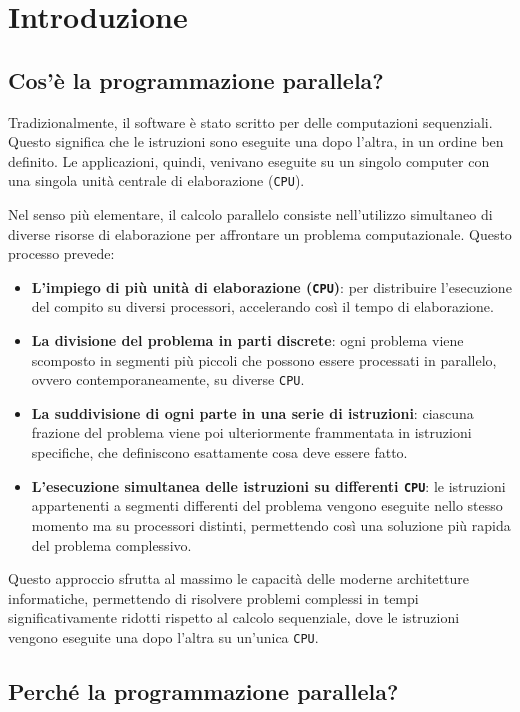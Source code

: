 \chapter{Introduzione}
\section{Cos'è la programmazione parallela?}
Tradizionalmente, il software è stato scritto per delle 
computazioni sequenziali. Questo significa che le istruzioni
sono eseguite una dopo l'altra, in un ordine ben definito.
Le applicazioni, quindi, venivano eseguite su un singolo
computer con una singola unità centrale di elaborazione (\texttt{CPU}).

Nel senso più elementare, il calcolo parallelo consiste nell'utilizzo
simultaneo di diverse risorse di elaborazione
per affrontare un problema computazionale. Questo processo prevede:
\begin{itemize}
    \item \textbf{L'impiego di più unità di elaborazione (\texttt{CPU})}: per distribuire
    l'esecuzione del compito
    su diversi processori, accelerando così il tempo di elaborazione.
    \item \textbf{La divisione del problema in parti
    discrete}: ogni problema viene scomposto in segmenti più piccoli che
    possono essere
    processati in parallelo, ovvero contemporaneamente, su diverse \texttt{CPU}.
    \item \textbf{La suddivisione di ogni parte in una serie di istruzioni}:
    ciascuna frazione del problema viene poi ulteriormente frammentata in istruzioni
    specifiche,
    che definiscono esattamente cosa deve essere fatto.
    \item \textbf{L'esecuzione simultanea delle istruzioni su differenti \texttt{CPU}}: le
    istruzioni appartenenti a segmenti differenti del problema vengono
    eseguite nello stesso momento ma su processori distinti,
    permettendo così una soluzione più rapida del problema complessivo.
\end{itemize}
Questo approccio sfrutta al massimo le capacità delle moderne architetture
informatiche, permettendo di risolvere problemi complessi in tempi
significativamente ridotti rispetto al calcolo sequenziale,
dove le istruzioni vengono eseguite una dopo l'altra su un'unica \texttt{CPU}.

\section{Perché la programmazione parallela?}

